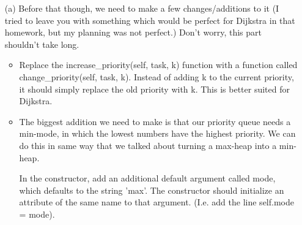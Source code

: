 \documentclass[12pt]{article}
\begin{document}
\begin{enumerate}
    \begin{itemize}
        \item[(a)] Before that though, we need to make a few changes/additions to it (I tried to leave you with something which would be perfect for Dijkstra in that homework, but my planning was not perfect.) Don't worry, this part shouldn't take long.
        \begin{itemize}
            \item Replace the increase\_priority(self, task, k) function with a function called change\_priority(self, task, k). Instead of adding k to the current priority, it should simply replace the old priority with k. This is better suited for Dijkstra. 
            \item The biggest addition we need to make is that our priority queue needs a min-mode, in which the lowest numbers have the highest priority. We can do this in same way that we talked about turning a max-heap into a min-heap. 
            
            In the constructor, add an additional default argument called mode, which defaults to the string 'max'. The constructor should initialize an attribute of the same name to that argument. (I.e. add the line self.mode = mode). 


\end{itemize}
\end{itemize}
\end{enumerate}
\end{document}
